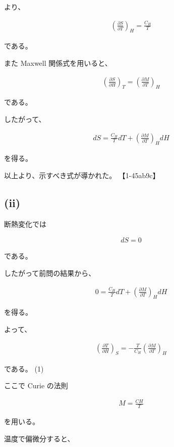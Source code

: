 \documentclass[platex,dvipdfmx,a4paper]{jsarticle}
\begin{document}
より、

\begin{align*}
\left(
\frac{\partial S}{\partial T}
\right)_H
=
\frac{C_H}{T}
\end{align*}

である。

また Maxwell 関係式を用いると、

\begin{align*}
\left(
\frac{\partial S}{\partial H}
\right)_T
=
\left(
\frac{\partial M}{\partial T}
\right)_H
\end{align*}

である。

したがって、

\begin{align*}
dS
=
\frac{C_H}{T}dT
+
\left(
\frac{\partial M}{\partial T}
\right)_H dH
\end{align*}

を得る。

以上より、示すべき式が導かれた。 【1-45ab9c】

\subsection{(ii)}

断熱変化では

\begin{align*}
dS=0
\end{align*}

である。

したがって前問の結果から、

\begin{align*}
0
=
\frac{C_H}{T}dT
+
\left(
\frac{\partial M}{\partial T}
\right)_H dH
\end{align*}

を得る。

よって、

\begin{align*}
\left(
\frac{\partial T}{\partial H}
\right)_S
=
-
\frac{T}{C_H}
\left(
\frac{\partial M}{\partial T}
\right)_H
\end{align*}

である。 \hfill (1)

ここで Curie の法則

\begin{align*}
M=\frac{CH}{T}
\end{align*}

を用いる。

温度で偏微分すると、
\end{document}
